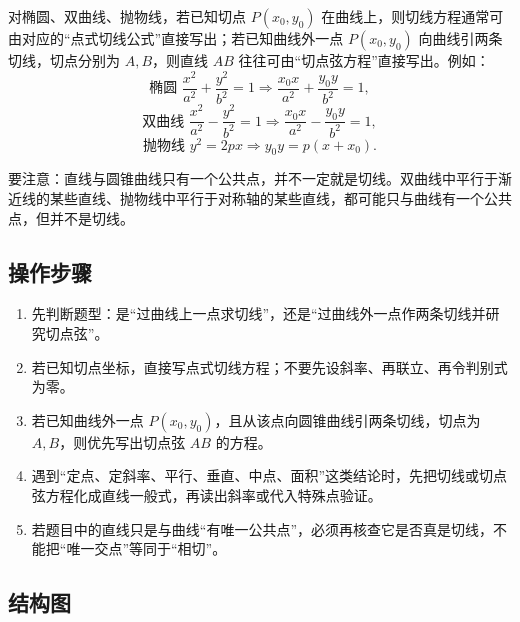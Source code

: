 \documentclass[UTF8,a4paper,11pt]{ctexart}
\begin{document}
对椭圆、双曲线、抛物线，若已知切点 $P(x_0,y_0)$ 在曲线上，则切线方程通常可由对应的“点式切线公式”直接写出；若已知曲线外一点 $P(x_0,y_0)$ 向曲线引两条切线，切点分别为 $A,B$，则直线 $AB$ 往往可由“切点弦方程”直接写出。例如：
\[
\text{椭圆 }\frac{x^2}{a^2}+\frac{y^2}{b^2}=1\Rightarrow \frac{x_0x}{a^2}+\frac{y_0y}{b^2}=1,
\]
\[
\text{双曲线 }\frac{x^2}{a^2}-\frac{y^2}{b^2}=1\Rightarrow \frac{x_0x}{a^2}-\frac{y_0y}{b^2}=1,
\]
\[
\text{抛物线 }y^2=2px\Rightarrow y_0y=p(x+x_0).
\]

要注意：直线与圆锥曲线只有一个公共点，并不一定就是切线。双曲线中平行于渐近线的某些直线、抛物线中平行于对称轴的某些直线，都可能只与曲线有一个公共点，但并不是切线。

\subsection*{操作步骤}

\begin{enumerate}

\item 先判断题型：是“过曲线上一点求切线”，还是“过曲线外一点作两条切线并研究切点弦”。

\item 若已知切点坐标，直接写点式切线方程；不要先设斜率、再联立、再令判别式为零。

\item 若已知曲线外一点 $P(x_0,y_0)$，且从该点向圆锥曲线引两条切线，切点为 $A,B$，则优先写出切点弦 $AB$ 的方程。

\item 遇到“定点、定斜率、平行、垂直、中点、面积”这类结论时，先把切线或切点弦方程化成直线一般式，再读出斜率或代入特殊点验证。

\item 若题目中的直线只是与曲线“有唯一公共点”，必须再核查它是否真是切线，不能把“唯一交点”等同于“相切”。

\end{enumerate}

\subsection*{结构图}

\begin{center}


\end{center}
\end{document}
